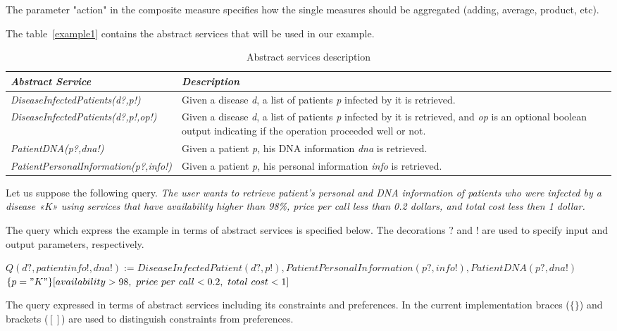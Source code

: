 \documentclass[12pt,a4paper,oneside]{article}
\begin{document}
The parameter "action" in the composite measure specifies how the single measures should be aggregated (adding, average, product, etc).

The table~\ref{example1} contains the abstract services that will be used in our example.

\begin{table}[h!]
\center
\begin{tabular}{|p{7cm}|p{7cm}|}
\hline 
\textbf{\textit{Abstract Service}} & \textbf{\textit{Description}} \\ 
\hline 
\textit{DiseaseInfectedPatients(d?,p!)} & Given a disease \textit{d}, a list of patients \textit{p} infected by it is retrieved. \\ 
\hline 
\textit{DiseaseInfectedPatients(d?,p!,op!)} & Given a disease \textit{d}, a list of patients \textit{p} infected by it is retrieved, and \textit{op} is an optional boolean output indicating if the operation proceeded well or not. \\ 
\hline 
\textit{PatientDNA(p?,dna!)} & Given a patient \textit{p}, his DNA information \textit{dna} is retrieved. \\ 
\hline 
\textit{PatientPersonalInformation(p?,info!)} & Given a patient \textit{p}, his personal information \textit{info} is retrieved. \\ 
\hline 
\end{tabular} \caption{Abstract services description}
\end{table}\label{example1}

\noindent Let us suppose the following query. 
\textit{The user wants to retrieve patient’s personal and DNA information of patients who were infected by a disease «K»	 using services that have availability higher than 98\%, price per call less than 0.2 dollars, and total cost less then 1 dollar.}

The query which express the example in terms of abstract services is specified below.
The decorations ? and ! are used to specify input and output parameters, respectively. 

\begin{center}
$Q (d?, patientinfo!, dna!) := DiseaseInfectedPatient (d?, p!), PatientPersonalInformation (p?, info!), PatientDNA (p?, dna!)$ \\ $\lbrace p="K" \rbrace [availability > 98, \ price \ per \ call < 0.2, \ total \ cost < 1]$ \\
\end{center}  

The query expressed in terms of abstract services including its constraints and preferences. In the current implementation braces ($\lbrace\rbrace$) and brackets ($[]$) are used to distinguish constraints from preferences.
\end{document}

